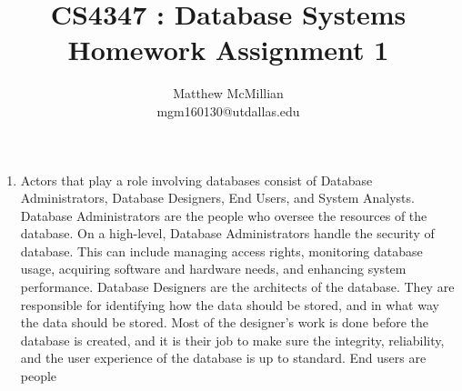 \documentclass[12pt]{article}
\begin{document}
\title{CS4347 : Database Systems\\Homework Assignment 1}
\author{Matthew McMillian\\mgm160130@utdallas.edu}
\maketitle



\begin{enumerate}
	
	\item Actors that play a role involving databases consist of Database Administrators, Database Designers, End Users, and System Analysts. Database Administrators are the people who oversee the resources of the database. On a high-level, Database Administrators handle the security of database. This can include managing access rights, monitoring database usage, acquiring software and hardware needs, and enhancing system performance. Database Designers are the architects of the database. They are responsible for identifying how the data should be stored, and in what way the data should be stored. Most of the designer's work is done before the database is created, and it is their job to make sure the integrity, reliability, and the user experience of the database is up to standard. End users are people 
	
\end{enumerate}
\end{document}
